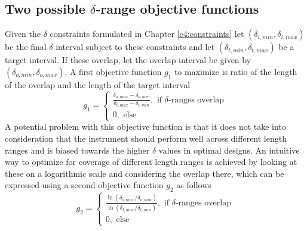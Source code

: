 \documentclass{article}
\newcommand{\targetrange}{$10 \unit{\nano\meter}$ to $5 \unit{\micro\meter}$ }
\begin{document}
\subsection{Two possible $\delta$-range objective functions}
\label{c5.2}
Given the $\delta$ constraints formulated in Chapter \ref{c4:constraints} let $(\delta_{i, min},\delta_{i, max})$ be the final $\delta$ interval subject to these constraints and let $(\delta_{t, min},\delta_{t, max})$ be a target interval. If these overlap, let the overlap interval be given by $(\delta_{o, min},\delta_{o, max})$. A first objective function $g_1$ to maximize is ratio of the length of the overlap and the length of the target interval
$$g_1 = \begin{cases}
	\frac{\delta_{o, max}-\delta_{o, min}}{\delta_{t, max} - \delta_{t, min}},\text{ if $\delta$-ranges overlap}\\
	0,\text{ else}
\end{cases}$$
A potential problem with this objective function is that it does not take into consideration that the instrument should perform well across different length ranges and is biased towards the higher $\delta$ values in optimal designs. An intuitive way to optimize for coverage of different length ranges is achieved by looking at these on a logarithmic scale and considering the overlap there, which can be expressed using a second objective function $g_2$ as follows 
$$g_2 = \begin{cases}
	\frac{\ln(\delta_{o, max}/\delta_{o, min})}{\ln(\delta_{t, max}/\delta_{t, min})},\text{ if $\delta$-ranges overlap}\\
	0,\text{ else}
\end{cases}$$
\end{document}

